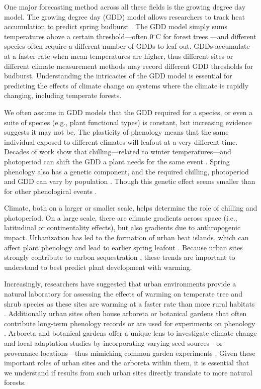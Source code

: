 \documentclass{article}\usepackage[]{graphicx}\usepackage[]{color}
\begin{document}
One major forecasting method across all these fields is the growing degree day model. The growing degree day (GDD) model allows researchers to track heat accumulation to predict spring budburst \citep{Schwartz2006,Vitasse2011,Cook2012,Phillimore2013,Crimmins2020}. The GDD model simply sums temperatures above a certain threshold---often 0$^{\circ}$C for forest trees  \citep[as estimates are proven to be more accurate,][]{Man2010}---and different species often require a different number of GDDs to leaf out. GDDs accumulate at a faster rate when mean temperatures are higher, thus different sites or different climate measurement methods may record different GDD thresholds for budburst. Understanding the intricacies of the GDD model is essential for predicting the effects of climate change on systems where the climate is rapidly changing, including temperate forests. 
  
We often assume in GDD models that the GDD required for a species, or even a suite of species (e.g., plant functional types) is constant, but increasing evidence suggests it may not be. The plasticity of phenology means that the same individual exposed to different climates will leafout at a very different time. Decades of work show that chilling---related to winter temperatures---and photoperiod can shift the GDD a plant needs for the same event \citep{Basler2012,Chuine2010,Zohner2016}. Spring phenology also has a genetic component, and the required chilling, photoperiod and GDD can vary by population \citep{Scotti2004,Cuervo-Alarcon2018}. Though this genetic effect seems smaller than for other phenological events \citep{McKown2013,Satake2013}.

Climate, both on a larger or smaller scale, helps determine the role of chilling and photoperiod. On a large scale, there are climate gradients across space (i.e., latitudinal or continentality effects), but also gradients due to anthropogenic impact. Urbanization has led to the formation of urban heat islands, which can affect plant phenology and lead to earlier spring leafout \citep{Meng2020}. Because urban sites strongly contribute to carbon sequestration \citep{Ziter2018}, these trends are important to understand to best predict plant development with warming. 
  
Increasingly, researchers have suggested that urban environments provide a natural laboratory for assessing the effects of warming on temperate tree and shrub species as these sites are warming at a faster rate than more rural habitats \citep{Grimm2008,Pickett2011}. Additionally urban sites often house arboreta or botanical gardens that often contribute long-term phenology records \citep{Zohner2014} or are used for experiments on phenology \citep{Ettinger2018}. Arboreta and botanical gardens offer a unique lens to investigate climate change and local adaptation studies by incorporating varying seed sources---or provenance locations---thus mimicking common garden experiments \citep{Primack2009}. Given these important roles of urban sites and the arboreta within them, it is essential that we understand if results from such urban sites directly translate to more natural forests. 
  
\end{document}
